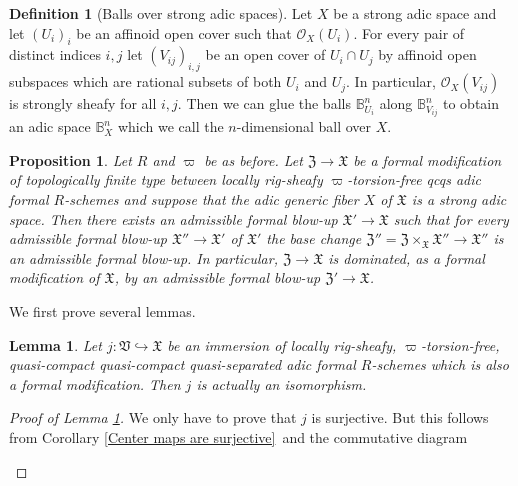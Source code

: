 \documentclass[12pt,twoside,a4paper]{article}
\newtheorem{lemma}[thm]{Lemma}
\newtheorem{prop}[thm]{Proposition}
\theoremstyle{definition}
\newtheorem{mydef}[thm]{Definition}
\theoremstyle{remark}
\newcommand\ad{{\rm ad}}
\newcommand\spc{{\rm sp}}
\begin{document}
\begin{mydef}[Balls over strong adic spaces]\label{Balls over strong adic spaces}Let $X$ be a strong adic space and let $(U_{i})_{i}$ be an affinoid open cover such that $\mathcal{O}_{X}(U_{i})$. For every pair of distinct indices $i, j$ let $(V_{ij})_{i,j}$ be an open cover of $U_{i}\cap U_{j}$ by affinoid open subspaces which are rational subsets of both $U_{i}$ and $U_{j}$. In particular, $\mathcal{O}_{X}(V_{ij})$ is strongly sheafy for all $i, j$. Then we can glue the balls $\mathbb{B}_{U_{i}}^{n}$ along $\mathbb{B}_{V_{ij}}^{n}$ to obtain an adic space $\mathbb{B}_{X}^{n}$ which we call the $n$-dimensional ball over $X$.\end{mydef}
\begin{prop}\label{Formal modifications vs. formal blow-ups}Let $R$ and $\varpi$ be as before. Let $\mathfrak{Z}\to \mathfrak{X}$ be a formal modification of topologically finite type between locally rig-sheafy $\varpi$-torsion-free qcqs adic formal $R$-schemes and suppose that the adic generic fiber $X$ of $\mathfrak{X}$ is a strong adic space. Then there exists an admissible formal blow-up $\mathfrak{X}'\to\mathfrak{X}$ such that for every admissible formal blow-up $\mathfrak{X}''\to\mathfrak{X}'$ of $\mathfrak{X}'$ the base change $\mathfrak{Z}''=\mathfrak{Z}\times_{\mathfrak{X}}\mathfrak{X}''\to\mathfrak{X}''$ is an admissible formal blow-up. In particular, $\mathfrak{Z}\to\mathfrak{X}$ is dominated, as a formal modification of $\mathfrak{X}$, by an admissible formal blow-up $\mathfrak{Z}'\to\mathfrak{X}$.\end{prop}
We first prove several lemmas.
\begin{lemma}\label{Immersions and formal modifications}Let $j: \mathfrak{V}\hookrightarrow \mathfrak{X}$ be an immersion of locally rig-sheafy, $\varpi$-torsion-free, quasi-compact quasi-compact quasi-separated adic formal $R$-schemes which is also a formal modification. Then $j$ is actually an isomorphism.\end{lemma}
\begin{proof}[Proof of Lemma \ref{Immersions and formal modifications}]We only have to prove that $j$ is surjective. But this follows from Corollary \ref{Center maps are surjective} and the commutative diagram \begin{center}\end{center}\end{proof}
\end{document}
